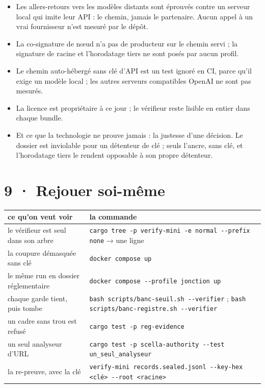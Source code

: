 \documentclass[10pt]{extarticle}
\newcommand{\code}[1]{\texttt{\small #1}}
\begin{document}
\begin{alerte}
\begin{itemize}[leftmargin=1.1em,itemsep=1pt,topsep=0pt]
\item Les allers-retours vers les modèles distants sont éprouvés contre un serveur local qui imite leur API : le
chemin, jamais le partenaire. Aucun appel à un vrai fournisseur n'est mesuré par le dépôt.
\item La co-signature de nœud n'a pas de producteur sur le chemin servi ; la signature de racine et l'horodatage tiers
ne sont posés par aucun profil.
\item Le chemin auto-hébergé sans clé d'API est un test ignoré en CI, parce qu'il exige un modèle local ; les autres
serveurs compatibles OpenAI ne sont pas mesurés.
\item La licence est propriétaire à ce jour ; le vérifieur reste lisible en entier dans chaque bundle.
\item Et ce que la technologie ne prouve jamais : la justesse d'une décision. Le dossier est inviolable pour un
détenteur de clé ; seuls l'ancre, sans clé, et l'horodatage tiers le rendent opposable à son propre détenteur.
\end{itemize}
\end{alerte}

\section{9 · Rejouer soi-même}

{\small
\renewcommand{\arraystretch}{1.12}
\begin{longtable}{@{}L{6.0cm}L{11.5cm}@{}}
\toprule
\textbf{ce qu'on veut voir} & \textbf{la commande} \\ \midrule \endhead
le vérifieur est seul dans son arbre & \code{cargo tree -p verify-mini -e normal -{}-prefix none} → une ligne \\
la coupure démasquée sans clé & \code{docker compose up} \\
le même run en dossier réglementaire & \code{docker compose -{}-profile jonction up} \\
chaque garde tient, puis tombe & \code{bash scripts/banc-seuil.sh -{}-verifier} ; \code{bash scripts/banc-registre.sh
-{}-verifier} \\
un cadre sans trou est refusé & \code{cargo test -p reg-evidence} \\
un seul analyseur d'URL & \code{cargo test -p scella-authority -{}-test un\_seul\_analyseur} \\
la re-preuve, avec la clé & \code{verify-mini records.sealed.jsonl -{}-key-hex <clé> -{}-root <racine>} \\
\bottomrule
\end{longtable}
}
\end{document}
